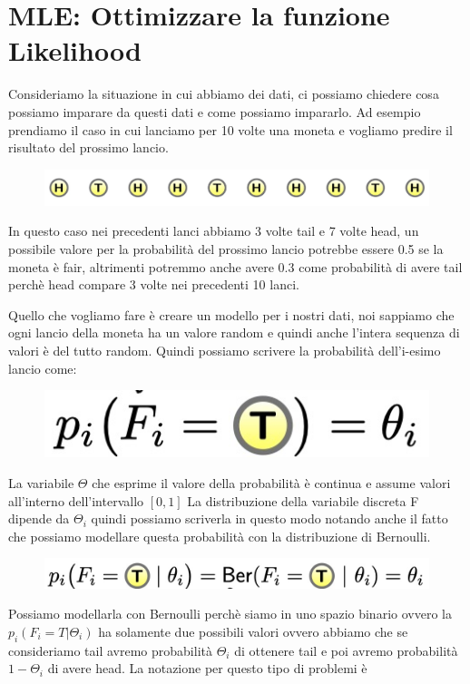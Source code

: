 \documentclass[14pt]{extreport}
\begin{document}
\section{MLE: Ottimizzare la funzione Likelihood}

Consideriamo la situazione in cui abbiamo dei dati, ci possiamo chiedere cosa possiamo imparare da questi dati e come possiamo impararlo. Ad esempio
prendiamo il caso in cui lanciamo per 10 volte una moneta e vogliamo predire il risultato del prossimo lancio.
\begin{figure}[H]
\centering
  \includegraphics[width=0.8\linewidth]{5.jpeg}
\end{figure}

In questo caso nei precedenti lanci abbiamo 3 volte tail e 7 volte head, un possibile valore per la probabilità del prossimo lancio potrebbe essere
0.5 se la moneta è fair, altrimenti potremmo anche avere 0.3 come probabilità di avere tail perchè head compare 3 volte nei precedenti 10 lanci.

Quello che vogliamo fare è creare un modello per i nostri dati, noi sappiamo che ogni lancio della moneta ha un valore random e quindi anche l'intera
sequenza di valori è del tutto random. Quindi possiamo scrivere la probabilità dell'i-esimo lancio come: 
\begin{figure}[H]
\centering
  \includegraphics[width=0.3\linewidth]{7.jpeg}
\end{figure}

La variabile $\Theta$ che esprime il valore della probabilità è continua e assume valori all'interno dell'intervallo $[0,1]$ La distribuzione della
variabile discreta F dipende da $\Theta_i$ quindi possiamo scriverla in questo modo notando anche il fatto che possiamo modellare questa probabilità
con la distribuzione di Bernoulli.
\begin{figure}[H]
\centering
  \includegraphics[width=0.6\linewidth]{8.jpeg}
\end{figure}

Possiamo modellarla con Bernoulli perchè siamo in uno spazio binario ovvero la $p_i(F_i = T | \Theta_i)$ ha solamente due possibili valori ovvero
abbiamo che se consideriamo tail avremo probabilità $\Theta_i$ di ottenere tail e poi avremo probabilità $1-\Theta_i$ di avere head. La notazione per
questo tipo di problemi è 
\end{document}
